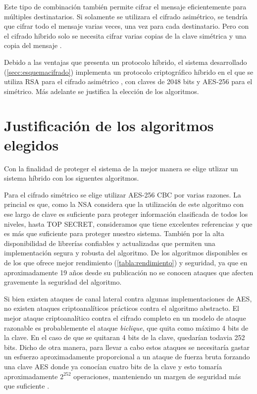 Este tipo de combinación también permite cifrar el mensaje eficientemente para 
múltiples destinatarios. Si solamente se utilizara el cifrado asimétrico, se 
tendría que cifrar todo 
el mensaje varias veces, una vez para cada destinatario. Pero con el cifrado 
híbrido solo se necesita cifrar varias copias de la clave simétrica y una 
copia del mensaje \cite{stackexchange-hybrid}.


Debido a las ventajas que presenta un protocolo híbrido, el sistema desarrollado 
(\autoref{secc:esquemacifrado}) implementa un protocolo 
criptográfico híbrido en el que se utiliza RSA para el cifrado asimétrico 
\autocite{ppt202}, con claves de 2048 bits y AES-256 para el simétrico. 
Más adelante se justifica la elección de los algoritmos.

\section{Justificación de los algoritmos elegidos}

Con la finalidad de proteger el sistema de la mejor manera se elige 
utlizar un sistema híbrido con los siguentes algoritmos.

Para el cifrado simétrico se elige utilizar AES-256 CBC por varias razones. 
La princial es que, como la NSA 
considera que la utilización de este algoritmo con ese largo de clave es 
suficiente para proteger información clasificada de todos los 
niveles, hasta TOP SECRET, consideramos que tiene excelentes referencias y que 
es más que suficiente para proteger nuestro sistema. También por la alta 
disponibilidad de librerías confiables y actualizadas que permiten una 
implementación segura y robusta del algoritmo. De los algoritmos disponibles es 
de los que ofrece mejor rendimiento (\autoref{tabla:rendimiento}) y seguridad, 
ya que en aproximadamente 19 años desde su publicación no se conocen ataques 
que afecten gravemente la seguridad del algoritmo. 

Si bien existen ataques de 
canal lateral contra algunas implementaciones de AES, no existen ataques 
criptoanalíticos prácticos contra el algoritmo abstracto. 
El mejor ataque criptoanalítico contra el cifrado completo en un modelo de 
ataque razonable es probablemente el ataque \emph{biclique}, que quita como máximo 4 
bits de la clave.
En el caso de que se quitaran 4 bits de la clave, quedarían todavia 252 bits. 
Dicho de otra manera, para llevar a cabo estos ataques se necesitaría gastar un esfuerzo 
aproximadamente proporcional a un ataque de fuerza bruta forzando una clave AES 
donde ya conocían cuatro bits de la clave y esto tomaría aproximadamente \(2^{252}\)
operaciones, manteniendo un margen de seguridad más que suficiente 
\cite{stackexchange-crypto-biclique}.


